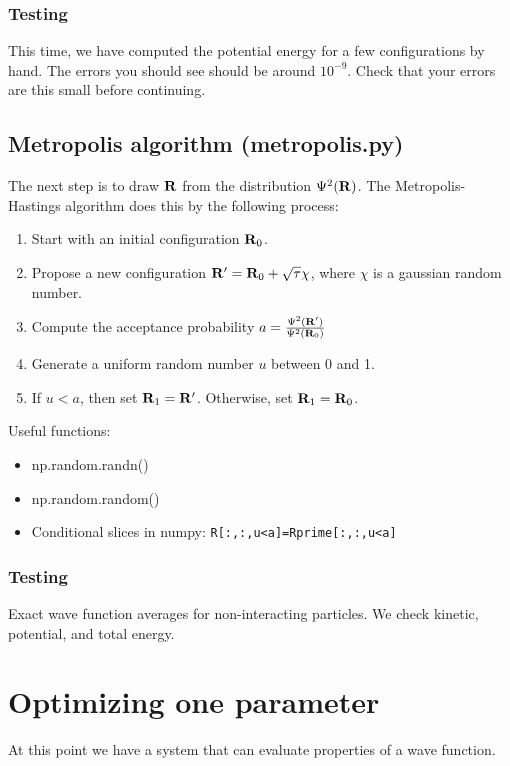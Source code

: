 \documentclass[12pt]{article}
\newcommand{\bR}{{\bf R}}
\begin{document}
\subsubsection{Testing}

This time, we have computed the potential energy for a few configurations by hand. 
The errors you should see should be around $10^{-9}$.
Check that your errors are this small before continuing.

\subsection{Metropolis algorithm (metropolis.py)}

The next step is to draw $\bR$ from the distribution $\Psi^2(\bR)$. 
The Metropolis-Hastings algorithm does this by the following process:
\begin{enumerate}
\item Start with an initial configuration $\bR_0$. 	
\item Propose a new configuration $\bR'=\bR_0 + \sqrt{\tau} \chi$, where $\chi$ is a gaussian random number.
\item Compute the acceptance probability $a=\frac{\Psi^2(\bR')}{\Psi^2(\bR_0)}$
\item Generate a uniform random number $u$ between 0 and 1. 
\item If $u < a$, then set $\bR_1=\bR'$. Otherwise, set $\bR_1=\bR_0$.
\end{enumerate}

Useful functions: 
\begin{itemize}
\item np.random.randn()
\item np.random.random()
\item Conditional slices in numpy: \verb|R[:,:,u<a]=Rprime[:,:,u<a]|
\end{itemize}

\subsubsection{Testing}

Exact wave function averages for non-interacting particles. We check kinetic, potential, and total energy.

\section{Optimizing one parameter}

At this point we have a system that can evaluate properties of a wave function. 
\end{document}
